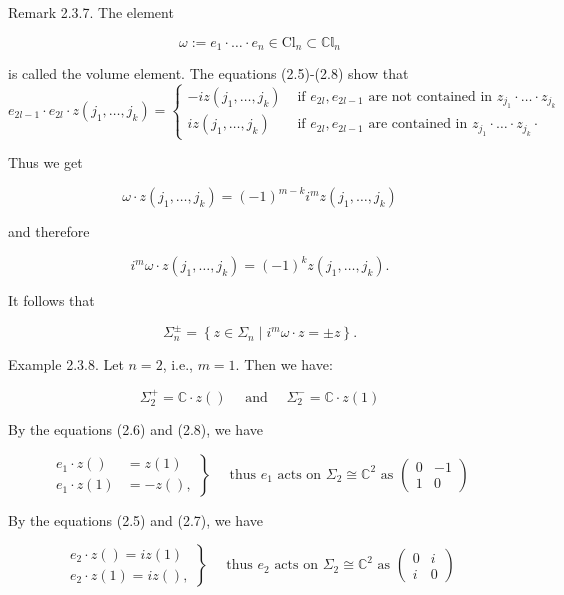 \documentclass[10pt, letterpaper]{article}
\begin{document}
Remark 2.3.7. The element

$$
\omega:=e_{1} \cdot \ldots \cdot e_{n} \in \mathrm{Cl}_{n} \subset \mathbb{C l}_{n}
$$

is called the volume element. The equations (2.5)-(2.8) show that\\
$e_{2 l-1} \cdot e_{2 l} \cdot z\left(j_{1}, \ldots, j_{k}\right)= \begin{cases}-i z\left(j_{1}, \ldots, j_{k}\right) & \text { if } e_{2 l}, e_{2 l-1} \text { are not contained in } z_{j_{1}} \cdot \ldots \cdot z_{j_{k}} \\ i z\left(j_{1}, \ldots, j_{k}\right) & \text { if } e_{2 l}, e_{2 l-1} \text { are contained in } z_{j_{1}} \cdot \ldots \cdot z_{j_{k}} \cdot\end{cases}$

Thus we get

$$
\omega \cdot z\left(j_{1}, \ldots, j_{k}\right)=(-1)^{m-k} i^{m} z\left(j_{1}, \ldots, j_{k}\right)
$$

and therefore

$$
i^{m} \omega \cdot z\left(j_{1}, \ldots, j_{k}\right)=(-1)^{k} z\left(j_{1}, \ldots, j_{k}\right) .
$$

It follows that

$$
\Sigma_{n}^{ \pm}=\left\{z \in \Sigma_{n} \mid i^{m} \omega \cdot z= \pm z\right\} .
$$

Example 2.3.8. Let $n=2$, i.e., $m=1$. Then we have:

$$
\Sigma_{2}^{+}=\mathbb{C} \cdot z() \quad \text { and } \quad \Sigma_{2}^{-}=\mathbb{C} \cdot z(1)
$$

By the equations (2.6) and (2.8), we have

$$
\left.\begin{array}{rl}
e_{1} \cdot z() & =z(1) \\
e_{1} \cdot z(1) & =-z(),
\end{array}\right\} \quad \text { thus } e_{1} \text { acts on } \Sigma_{2} \cong \mathbb{C}^{2} \text { as }\left(\begin{array}{cc}
0 & -1 \\
1 & 0
\end{array}\right)
$$

By the equations (2.5) and (2.7), we have

$$
\left.\begin{array}{r}
e_{2} \cdot z()=i z(1) \\
e_{2} \cdot z(1)=i z(),
\end{array}\right\} \quad \text { thus } e_{2} \text { acts on } \Sigma_{2} \cong \mathbb{C}^{2} \text { as }\left(\begin{array}{cc}
0 & i \\
i & 0
\end{array}\right)
$$
\end{document}
